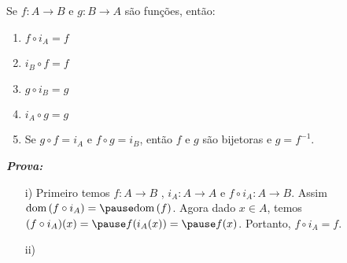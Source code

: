\documentclass{beamer}
\begin{document}
    \begin{frame}
        \begin{proposicao}
            Se $f : A \to B$ \pause e $g : B \to A$ \pause s{\~a}o fun{\c c}{\~o}es, \pause ent{\~a}o:\pause
            \begin{enumerate}[label={\roman*})]
                \item $f\circ i_{A} = f$\pause

                \vspace{.3cm}

                \item $i_{B}\circ f = f$\pause
                
                \vspace{.3cm}

                \item $g\circ i_{B} = g$\pause

                \vspace{.3cm}

                \item $i_{A}\circ g = g$\pause

                \vspace{.3cm}

                \item Se $g\circ f = i_{A}$ \pause e $f\circ g = i_{B}$, \pause ent{\~a}o \pause $f$ e $g$ s{\~a}o bijetoras \pause e $g=f^{-1}$.\pause
            \end{enumerate}
        \end{proposicao}
    \end{frame}

    \begin{frame}
        \noindent \textbf{\textit{Prova:}}
        \begin{enumerate}
            \item[i)] Primeiro temos $f: A \to B$ \pause, $i_{A} : A \to A$ \pause e $f\circ i_{A} : A \to B$. \pause Assim \pause $\dom(f\circ i_{A}) = \pause \dom(f)$. \pause Agora dado $x \in A$, \pause temos $(f\circ i_{A})(x) = \pause f(i_{A}(x)) = \pause f(x)$. Portanto, \pause $f\circ i_{A} = f$.\pause

            \vspace{.3cm}

            \item[ii)]
        \end{enumerate}
    \end{frame}
\end{document}
